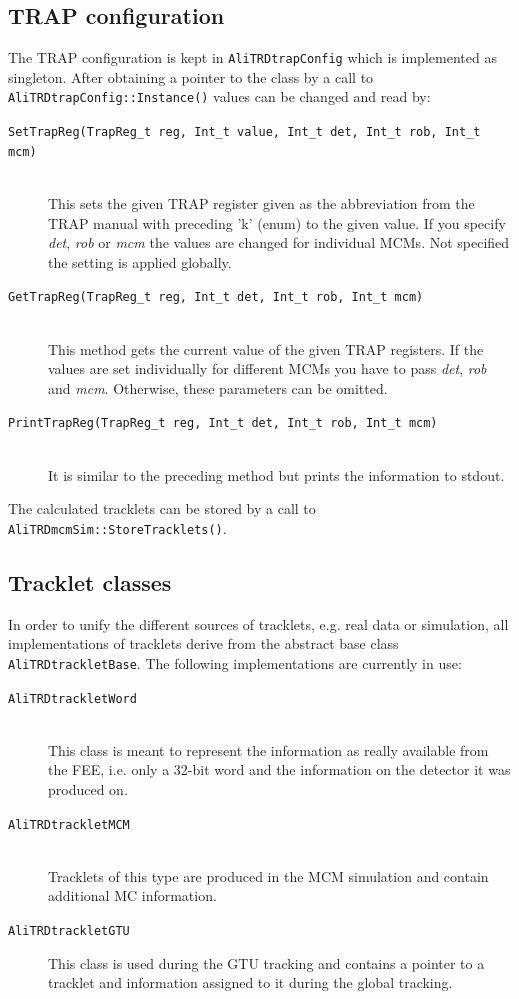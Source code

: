 \documentclass{alicetdr}
\begin{document}
\subsection{TRAP configuration}
\label{sec:trapcfg}
The TRAP configuration is kept in {\tt AliTRDtrapConfig} which is
implemented as singleton. After obtaining a pointer to the class by a
call to {\tt AliTRDtrapConfig::Instance()} values can be changed and read by:
\begin{description}
\item[{\tt SetTrapReg(TrapReg\_t reg, Int\_t value, Int\_t det, Int\_t rob,
  Int\_t mcm)}] ~\\ This sets the given TRAP register given as the
  abbreviation from the TRAP manual with preceding 'k' (enum) to the
  given value. If you specify {\it det}, {\it rob} or {\it mcm} the
  values are changed for individual MCMs. Not specified the setting is
  applied globally.
\item[{\tt GetTrapReg(TrapReg\_t reg, Int\_t det, Int\_t rob, Int\_t mcm)}]
  ~\\ This method gets the current value of the given TRAP
  registers. If the values are set individually for different MCMs you
  have to pass {\it det}, {\it rob} and {\it mcm}. Otherwise, these
  parameters can be omitted.
\item[{\tt PrintTrapReg(TrapReg\_t reg, Int\_t det, Int\_t rob, Int\_t mcm)}]
  ~\\ It is similar to the preceding method but prints the information
  to stdout.
\end{description}

The calculated tracklets can be stored by a call to {\tt AliTRDmcmSim::StoreTracklets()}.

\subsection{Tracklet classes}
In order to unify the different sources of tracklets, e.g. real data
or simulation, all implementations of tracklets derive from the
abstract base class {\tt AliTRDtrackletBase}. The following
implementations are currently in use:
\begin{description}
\item[{\tt AliTRDtrackletWord}] ~\\ This class is meant to represent the
  information as really available from the FEE, i.e. only a 32-bit
  word and the information on the detector it was produced on.
\item[{\tt AliTRDtrackletMCM}] ~\\ Tracklets of this type are produced in
  the MCM simulation and contain additional MC information.
\item[{\tt AliTRDtrackletGTU}] This class is used during the GTU tracking
  and contains a pointer to a tracklet and information assigned to it
  during the global tracking.
\end{description}
\end{document}
